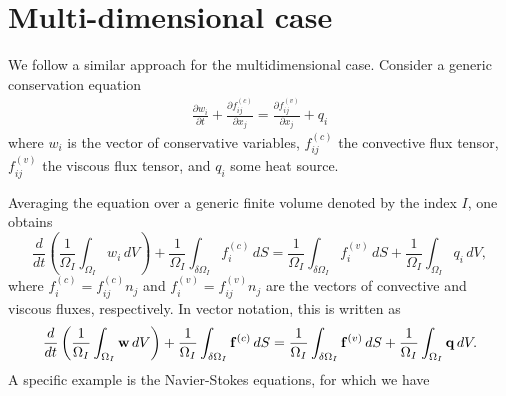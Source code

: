 \documentclass[oneside,a4paper,11pt]{report}
\begin{document}
\section{Multi-dimensional case}
We follow a similar approach for the multidimensional case. Consider a generic conservation equation
\begin{align}
\frac{\partial w_i}{\partial t} + \frac{\partial f^{(c)}_{ij}}{\partial x_j} = \frac{\partial f^{(v)}_{ij}}{\partial x_j} + q_i
\end{align}
where $w_i$ is the vector of conservative variables, $f^{(c)}_{ij}$ the convective flux tensor, $f^{(v)}_{ij}$ the viscous flux tensor, and $q_i$ some heat source. 

Averaging the equation over a generic finite volume denoted by the index $I$, one obtains
\begin{equation}
\frac{d}{d t} \left ( \frac{1}{\Omega_I} \int_{\Omega_I} w_i \, dV \right)+  \frac{1}{\Omega_I} \int_{\delta \Omega_I} f^{(c)}_i \,dS = \frac{1}{\Omega_I} \int_{\delta \Omega_I} f^{(v)}_i \, dS + \frac{1}{\Omega_I} \int_{\Omega_I} q_i \,dV,
\end{equation}
where $f^{(c)}_i = f^{(c)}_{ij} n_j$ and $f^{(v)}_i = f^{(v)}_{ij} n_j$ are the vectors of convective and viscous fluxes, respectively. In vector notation, this is written as
\begin{equation}
\frac{d }{d t} \left ( \frac{1}{\Omega_I} \int_{\Omega_I} \mathbf{w} \,dV \right) +  \frac{1}{\Omega_I} \int_{\delta \Omega_I} \mathbf{f}^{(c)} \,dS = \frac{1}{\Omega_I} \int_{\delta \Omega_I} \mathbf{f}^{(v)} \, dS + \frac{1}{\Omega_I} \int_{\Omega_I} \mathbf{q} \,dV.
\end{equation}
A specific example is the Navier-Stokes equations, for which we have
\end{document}
